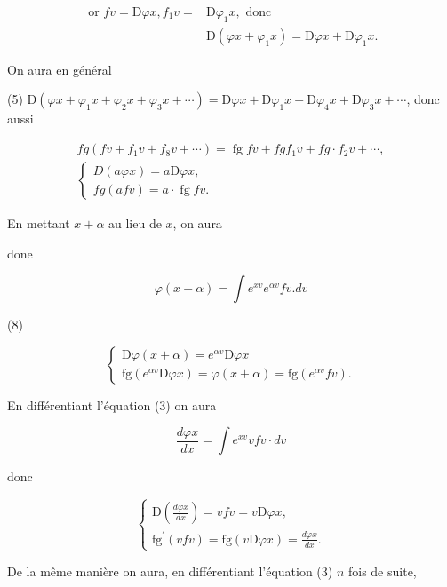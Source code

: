 \documentclass{article}
\begin{document}
\[
\begin{aligned}
\text { or } f v=\mathrm{D} \varphi x, f_{1} v= & \mathrm{D} \varphi_{1} x, \text { donc } \\
& \mathrm{D}\left(\varphi x+\varphi_{1} x\right)=\mathrm{D} \varphi x+\mathrm{D} \varphi_{1} x .
\end{aligned}
\]

On aura en général

(5) \(\mathrm{D}\left(\varphi x+\varphi_{1} x+\varphi_{2} x+\varphi_{3} x+\cdots\right)=\mathrm{D} \varphi x+\mathrm{D} \varphi_{1} x+\mathrm{D} \varphi_{4} x+\mathrm{D} \varphi_{3} x+\cdots\), donc aussi

\[
\begin{gathered}
f g\left(f v+f_{1} v+f_{8} v+\cdots\right)=\operatorname{fg} f v+f g f_{1} v+f g \cdot f_{2} v+\cdots, \\
\left\{\begin{array}{l}
D(a \varphi x)=a \mathrm{D} \varphi x, \\
f g(a f v)=a \cdot \operatorname{fg} f v .
\end{array}\right.
\end{gathered}
\]

En mettant \(x+\alpha\) au lieu de \(x\), on aura

done

\[
\varphi(x+\alpha)=\int e^{x v} e^{\alpha v} f v . d v
\]

(8)

\[
\left\{\begin{array}{l}
\mathrm{D} \varphi(x+\alpha)=e^{\alpha v} \mathrm{D} \varphi x \\
\mathrm{fg}\left(e^{\alpha v} \mathrm{D} \varphi x\right)=\varphi(x+\alpha)=\mathrm{fg}\left(e^{\alpha v} f v\right) .
\end{array}\right.
\]

En différentiant l'équation (3) on aura

\[
\frac{d \varphi x}{d x}=\int e^{x v} v f v \cdot d v
\]

donc

\[
\left\{\begin{array}{l}
\mathrm{D}\left(\frac{d \varphi x}{d x}\right)=v f v=v \mathrm{D} \varphi x, \\
\mathrm{fg}^{\prime}(v f v)=\mathrm{fg}(v \mathrm{D} \varphi x)=\frac{d \varphi x}{d x} .
\end{array}\right.
\]

De la même manière on aura, en différentiant l'équation (3) \(n\) fois de suite,
\end{document}
